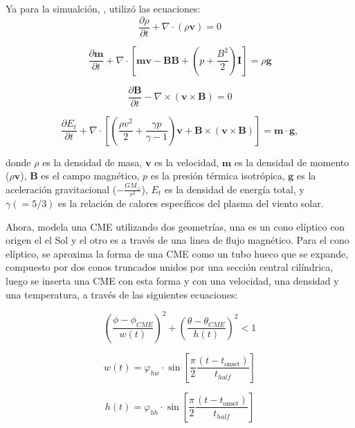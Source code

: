 Ya para la simualción, \cite{mayank-2023}, utilizó las ecuaciones:
\[\frac{\partial \rho}{\partial t} + \nabla \cdot (\rho \mathbf{v}) = 0 \tag{4}\]

\[\frac{\partial \mathbf{m}}{\partial t} + \nabla \cdot \left[ \mathbf{mv} - \mathbf{BB} + \left( p + \frac{B^2}{2} \right) \mathbf{I} \right] = \rho \mathbf{g} \tag{5}\]

\[\frac{\partial \mathbf{B}}{\partial t} - \nabla \times (\mathbf{v} \times \mathbf{B}) = 0 \tag{6}\]

\[\frac{\partial E_t}{\partial t} + \nabla \cdot \left[ \left( \frac{\rho v^2}{2} + \frac{\gamma p}{\gamma - 1} \right) \mathbf{v} + \mathbf{B} \times (\mathbf{v} \times \mathbf{B}) \right] = \mathbf{m} \cdot \mathbf{g}, \tag{7}\]

donde $\rho$ es la densidad de masa, $\mathbf{v}$ es la velocidad, $\mathbf{m}$ es la densidad de momento ($\rho \mathbf{v}$), $\mathbf{B}$ es el campo magnético, $p$ es la presión térmica isotrópica, $\mathbf{g}$ es la aceleración gravitacional ($-\frac{GM_{\odot}}{r^2}$), $E_t$ es la densidad de energía total, y $\gamma (=5/3)$ es la relación de calores específicos del plasma del viento solar.

Ahora, \cite{mayank-2023} modela una \ac{CME} utilizando dos geometrías, una es un cono elíptico con origen el el Sol y el otro es a través de una linea de flujo magnético. Para el  cono elíptico, se aproxima la forma de una \ac{CME} como un tubo hueco que se expande, compuesto por dos conos truncados unidos por una sección central cilíndrica, luego se inserta una \ac{CME} con esta forma y con una velocidad, una densidad  y una temperatura, a través de las siguientes ecuaciones:

 
 
\begin{equation}
\left( \frac{\phi-\phi_{{CME}}}{w(t)} \right)^{2}+\left( \frac{\theta-\theta_{CME}}{h(t)} \right)^{2}<1
\end{equation}

\begin{equation}
w(t)=\varphi_{hw}\cdot \sin\left[\frac{\pi}{2}\frac{(t-t_{\text{onset}})}{t_{half}} \right]
\end{equation}

\begin{equation}
h(t)=\varphi_{hh}\cdot \sin\left[\frac{\pi}{2}\frac{(t-t_{\text{onset}})}{t_{half}} \right]
\end{equation}

